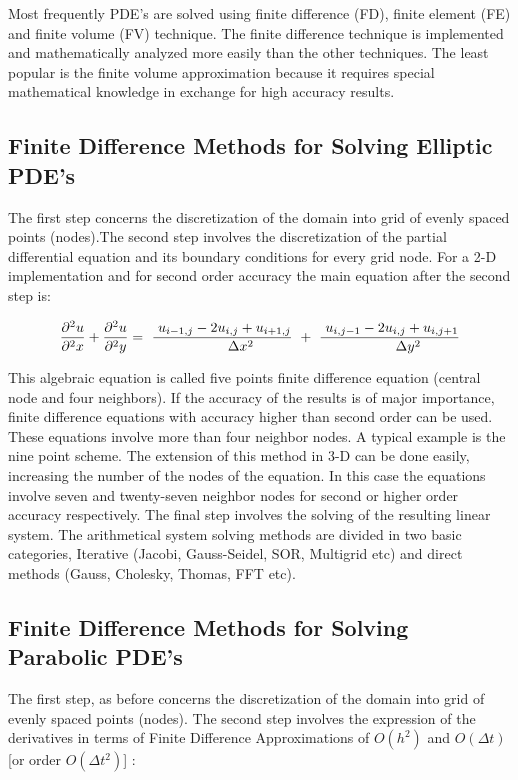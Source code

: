 Most frequently PDE's are solved using finite difference (FD), finite element (FE) and finite volume (FV) technique. The finite difference technique is implemented and mathematically analyzed more easily than the other techniques. The least popular is the finite volume approximation because it requires special mathematical knowledge in exchange for high accuracy results.



\subsection{Finite Difference Methods for Solving Elliptic PDE's}
The first step concerns the discretization of the domain into grid of evenly spaced points (nodes).The second step involves the discretization of the partial differential equation and its boundary conditions for every grid node. For a 2-D implementation and for second order accuracy the main equation after the second step is:


\[ \frac{\partial^2 u}{\partial^2 x} + \frac{\partial^2 u}{\partial^2 y}
   = \ \frac{\ u_{i-1,j} -2u_{i,j} + u_{i+1,j} }{\\\Delta x^2}\ + \ \frac{\ u_{i,j-1} -2u_{i,j} + u_{i,j+1} }{\\\Delta y^2}\]
      

This algebraic equation is called five points finite difference equation (central node and four neighbors). If the accuracy of the results is of major importance, finite difference equations with accuracy higher than second order can be used. These equations involve more than four neighbor nodes. A typical example is the nine point scheme. The extension of this method in 3-D can be done easily, increasing the number of the nodes of the equation. In this case the equations involve seven and twenty-seven neighbor nodes for second or higher order accuracy respectively. The final step involves the solving of the resulting linear system. The arithmetical system solving methods are divided in two basic categories, Iterative (Jacobi, Gauss-Seidel, SOR, Multigrid etc) and direct methods (Gauss, Cholesky, Thomas, FFT etc).

\subsection{Finite Difference Methods for Solving Parabolic PDE's}
The first step, as before concerns the discretization of the domain into grid of evenly spaced points (nodes). The second step involves the expression of the derivatives in terms of Finite Difference Approximations of $O(h^2)$ and $O(Δt)$ [or order $O(Δt^2)$] :

